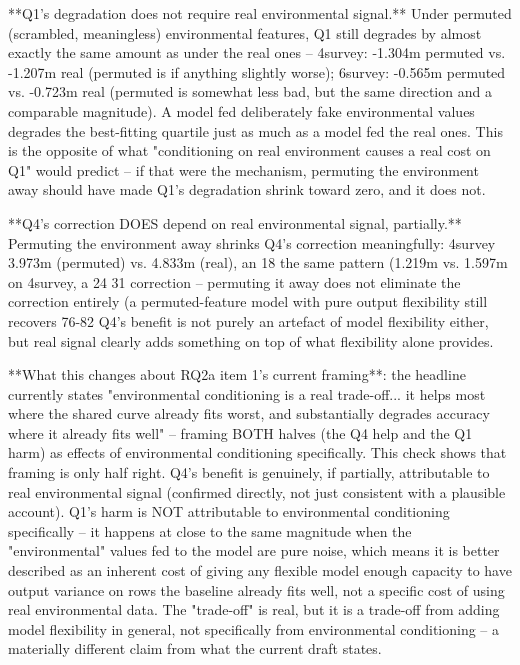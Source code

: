 **Q1's degradation does not require real environmental signal.** Under permuted (scrambled,
meaningless) environmental features, Q1 still degrades by almost exactly the same amount as under
the real ones -- 4survey: -1.304m permuted vs. -1.207m real (permuted is if anything slightly
worse); 6survey: -0.565m permuted vs. -0.723m real (permuted is somewhat less bad, but the same
direction and a comparable magnitude). A model fed deliberately fake environmental values degrades
the best-fitting quartile just as much as a model fed the real ones. This is the opposite of what
"conditioning on real environment causes a real cost on Q1" would predict -- if that were the
mechanism, permuting the environment away should have made Q1's degradation shrink toward zero,
and it does not.

**Q4's correction DOES depend on real environmental signal, partially.** Permuting the
environment away shrinks Q4's correction meaningfully: 4survey 3.973m (permuted) vs. 4.833m (real),
an 18%
the same pattern (1.219m vs. 1.597m on 4survey, a 24%
31%
correction -- permuting it away does not eliminate the correction entirely (a permuted-feature
model with pure output flexibility still recovers 76-82%
Q4's benefit is not purely an artefact of model flexibility either, but real signal clearly adds
something on top of what flexibility alone provides.

**What this changes about RQ2a item 1's current framing**: the headline currently states
"environmental conditioning is a real trade-off... it helps most where the shared curve already
fits worst, and substantially degrades accuracy where it already fits well" -- framing BOTH halves
(the Q4 help and the Q1 harm) as effects of environmental conditioning specifically. This check
shows that framing is only half right. Q4's benefit is genuinely, if partially, attributable to
real environmental signal (confirmed directly, not just consistent with a plausible account). Q1's
harm is NOT attributable to environmental conditioning specifically -- it happens at close to the
same magnitude when the "environmental" values fed to the model are pure noise, which means it is
better described as an inherent cost of giving any flexible model enough capacity to have output
variance on rows the baseline already fits well, not a specific cost of using real environmental
data. The "trade-off" is real, but it is a trade-off from adding model flexibility in general, not
specifically from environmental conditioning -- a materially different claim from what the current
draft states.

